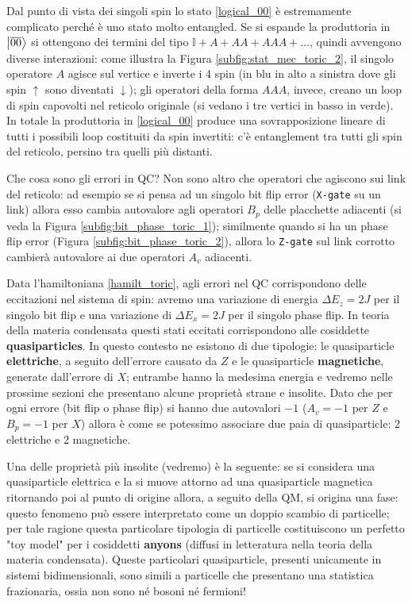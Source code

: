 \noindent Dal punto di vista dei singoli spin lo stato \eqref{logical_00} è estremamente complicato perché è uno stato molto entangled. Se si espande la produttoria in $\ket{\overline{00}}$ si ottengono dei termini del tipo $\mathbb{I} + A + AA + AAA + \ldots$, quindi avvengono diverse interazioni: come illustra la Figura \ref{subfig:stat_mec_toric_2}, il singolo operatore $A$ agisce sul vertice e inverte i 4 spin (in blu in alto a sinistra dove gli spin $\uparrow$ sono diventati $\downarrow$); gli operatori della forma $AAA$, invece, creano un loop di spin capovolti nel reticolo originale (si vedano i tre vertici in basso in verde). In totale la produttoria in \eqref{logical_00} produce una sovrapposizione lineare di tutti i possibili loop costituiti da spin invertiti: c'è entanglement tra tutti gli spin del reticolo, persino tra quelli più distanti. 

\noindent Che cosa sono gli errori in QC? Non sono altro che operatori che agiscono sui link del reticolo: ad esempio se si pensa ad un singolo bit flip error (\texttt{X-gate} su un link) allora esso cambia autovalore agli operatori $B_p$ delle placchette adiacenti (si veda la Figura \ref{subfig:bit_phase_toric_1}); similmente quando si ha un phase flip error (Figura \ref{subfig:bit_phase_toric_2}), allora lo \texttt{Z-gate} sul link corrotto cambierà autovalore ai due operatori $A_v$ adiacenti. 

\noindent Data l'hamiltoniana \eqref{hamilt_toric}, agli errori nel QC corrispondono delle eccitazioni nel sistema di spin: avremo una variazione di energia $\Delta E_z = 2 J$ per il singolo bit flip e una variazione di $\Delta E_x = 2 J$ per il singolo phase flip. In teoria della materia condensata questi stati eccitati corrispondono alle cosiddette \textbf{quasiparticles}. In questo contesto ne esistono di due tipologie: le quasiparticle \textbf{elettriche}, a seguito dell'errore causato da $Z$ e le quasiparticle \textbf{magnetiche}, generate dall'errore di $X$; entrambe hanno la medesima energia e  vedremo nelle prossime sezioni che presentano alcune proprietà strane e insolite. Dato che per ogni errore (bit flip o phase flip) si hanno due autovalori $-1$ ($A_v = -1$ per $Z$ e $B_p = -1$ per $X$) allora è come se potessimo associare due paia di quasiparticle: 2 elettriche e 2 magnetiche. 

\noindent Una delle proprietà più insolite (vedremo) è la seguente: se si considera una quasiparticle elettrica e la si muove attorno ad una quasiparticle magnetica ritornando poi al punto di origine allora, a seguito della QM, si origina una fase: questo fenomeno può essere interpretato come un doppio scambio di particelle; per tale ragione questa particolare tipologia di particelle costituiscono un perfetto "toy model" per i cosiddetti \textbf{anyons} (diffusi in letteratura nella teoria della materia condensata). Queste particolari quasiparticle, presenti unicamente in sistemi bidimensionali, sono simili a particelle che presentano una statistica frazionaria, ossia non sono né bosoni né fermioni!